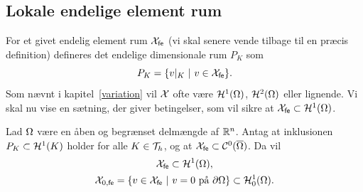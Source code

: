 \subsection{Lokale endelige element rum}
For et givet endelig element rum ${\mathcal{X}}_{\mathsf{fe}}$ (vi skal senere vende tilbage til en
præcis definition) defineres det endelige dimensionale rum $P_K$ som
\begin{equation}
  P_K=\{v|_K \ | \ v\in {\mathcal{X}}_{\mathsf{fe}} \}.
\end{equation} Som nævnt i kapitel~\ref{variation} vil $\mathcal{X}$ ofte være
${\mathcal H}^1(\Omega)$, ${\mathcal H}^2(\Omega)$ eller lignende. Vi skal nu vise en sætning, der giver 
betingelser, som vil sikre at ${\mathcal{X}}_{\mathsf{fe}} \subset {\mathcal H}^1(\Omega)$.
\begin{theorem} \label{xfehet}
Lad $\Omega$ være en åben og begrænset delmængde af $\mathbb{R}^n$. Antag at
inklusionen $P_K \subset \mathcal H^1(K)$ holder for alle $K\in {\cal{T}}_h$, og at
${\mathcal{X}}_{\mathsf{fe}} \subset {\cal{C}}^0(\overline{\Omega})$. Da vil
\begin{gather} 
  {\mathcal{X}}_{\mathsf{fe}} \subset \mathcal H^1(\Omega), \\ 
  {\mathcal X}_{0,{\mathsf{fe}}} = \{ v \in {\mathcal{X}}_{\mathsf{fe}} \ | \ v = 0 \ \text{på $\partial\Omega$} \} 
  \subset \mathcal H^1_0(\Omega). 
\end{gather}
\end{theorem}
